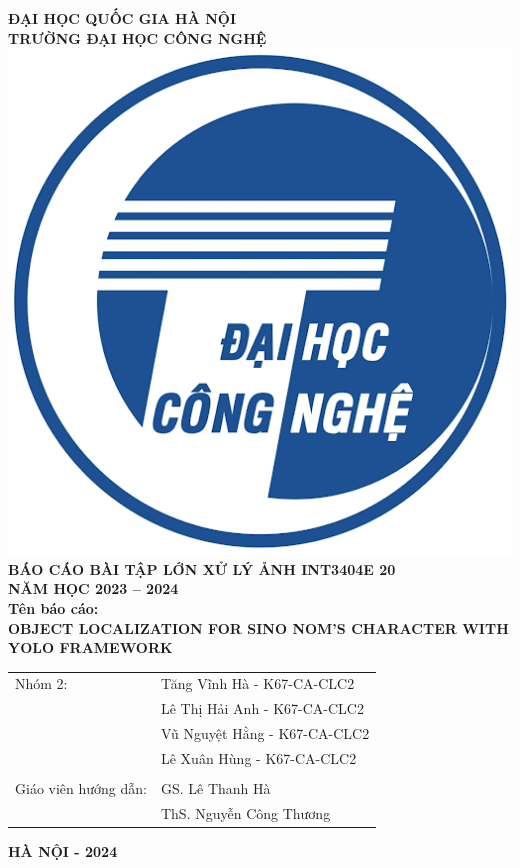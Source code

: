 \documentclass[a4paper,12pt]{article}
\begin{document}
\thispagestyle{empty}


\begin{center}
\changefontsizes{14pt}

	\textbf{ĐẠI HỌC QUỐC GIA HÀ NỘI\\TRƯỜNG ĐẠI HỌC CÔNG NGHỆ}\\[1cm]
	\includegraphics[width=0.2\linewidth]{images/uet.jpg}\\[0.3cm]
        \textbf{BÁO CÁO BÀI TẬP LỚN XỬ LÝ ẢNH INT3404E 20}
        \\
        \textbf{NĂM HỌC 2023 – 2024}
	\\[2cm]
	\large{\textbf{Tên báo cáo:}} \\
	\large{\textbf{OBJECT LOCALIZATION FOR SINO NOM'S CHARACTER WITH YOLO FRAMEWORK}}
	\\[2.6cm]
        \begin{tabular}{l l}
    
            Nhóm 2: &{Tăng Vĩnh Hà - K67-CA-CLC2} \\
            &{Lê Thị Hải Anh - K67-CA-CLC2} \\
            &{Vũ Nguyệt Hằng - K67-CA-CLC2} \\ 
            &{Lê Xuân Hùng - K67-CA-CLC2} \\
            \\[0.25cm]
            
            Giáo viên hướng dẫn: &{GS. Lê Thanh Hà}\\
            &{ThS. Nguyễn Công Thương}\\
            
        \end{tabular}

	\vfill
	\textbf{HÀ NỘI - 2024}
	\vspace{10mm}
\end{center}
\clearpage
\end{document}
